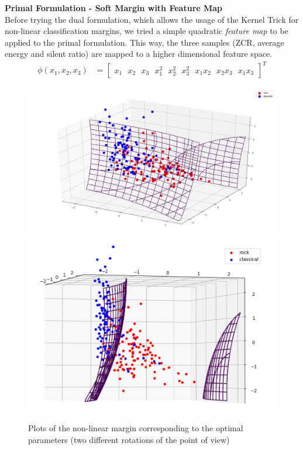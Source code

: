 \documentclass[12pt]{article}
\begin{document}
	\textbf{Primal Formulation - Soft Margin with Feature Map}\\
	Before trying the dual formulation, which allows the usage of the Kernel Trick for non-linear classification margins, we tried a simple quadratic \textit{feature map} to be applied to the primal formulation. This way, the three samples (ZCR, average energy and silent ratio) are mapped to a higher dimensional feature space.
	\begin{align}
		\phi(x_1, x_2, x_3) &= \begin{bmatrix}
			x_1 \ \ \
			x_2 \ \ \
			x_3 \ \ \
			x_1^2 \ \ \
			x_2^2 \ \ \
			x_3^2 \ \ \
			x_1x_2 \ \ \
			x_2x_3 \ \ \
			x_1x_3
		\end{bmatrix} ^T
	\end{align}

	\begin{figure}[H]
		\includegraphics[scale=0.4]{quad_feat}
		\includegraphics[scale=0.4]{quad_feat_side}
		\caption{Plots of the non-linear margin corresponding to the optimal parameters (two different rotations of the point of view)}
	\end{figure}
	
\end{document}
